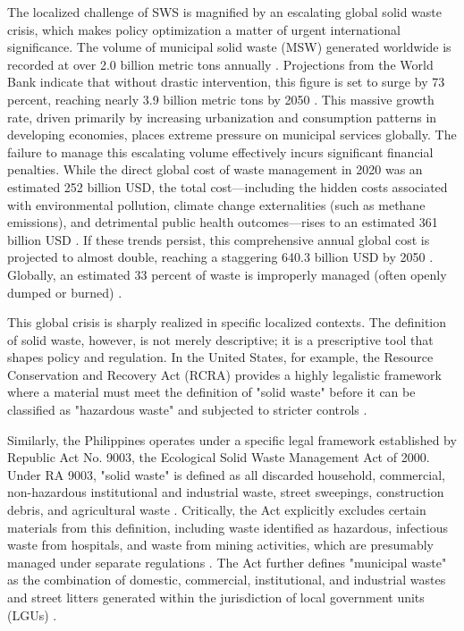 The localized challenge of SWS is magnified by an escalating global solid waste crisis, which makes policy optimization a matter of urgent international significance. The volume of municipal solid waste (MSW) generated worldwide is recorded at over 2.0 billion metric tons annually \citep{Kaza2021}. Projections from the World Bank indicate that without drastic intervention, this figure is set to surge by 73 percent, reaching nearly 3.9 billion metric tons by 2050 \citep{WorldBank2025, WorldBank2021}. This massive growth rate, driven primarily by increasing urbanization and consumption patterns in developing economies, places extreme pressure on municipal services globally. The failure to manage this escalating volume effectively incurs significant financial penalties. While the direct global cost of waste management in 2020 was an estimated 252 billion USD, the total cost—including the hidden costs associated with environmental pollution, climate change externalities (such as methane emissions), and detrimental public health outcomes—rises to an estimated 361 billion USD \citep{UNEP2024}. If these trends persist, this comprehensive annual global cost is projected to almost double, reaching a staggering 640.3 billion USD by 2050 \citep{UNEP2024}. Globally, an estimated 33 percent of waste is improperly managed (often openly dumped or burned) \citep{Kaza2021}.

This global crisis is sharply realized in specific localized contexts. The definition of solid waste, however, is not merely descriptive; it is a prescriptive tool that shapes policy and regulation. In the United States, for example, the Resource Conservation and Recovery Act (RCRA) provides a highly legalistic framework where a material must meet the definition of "solid waste" before it can be classified as "hazardous waste" and subjected to stricter controls \citep{WHO2024}.

Similarly, the Philippines operates under a specific legal framework established by Republic Act No. 9003, the Ecological Solid Waste Management Act of 2000. Under RA 9003, "solid waste" is defined as all discarded household, commercial, non-hazardous institutional and industrial waste, street sweepings, construction debris, and agricultural waste \citep{RA9003}. Critically, the Act explicitly excludes certain materials from this definition, including waste identified as hazardous, infectious waste from hospitals, and waste from mining activities, which are presumably managed under separate regulations \citep{RA9003}. The Act further defines "municipal waste" as the combination of domestic, commercial, institutional, and industrial wastes and street litters generated within the jurisdiction of local government units (LGUs) \citep{RA9003}.

